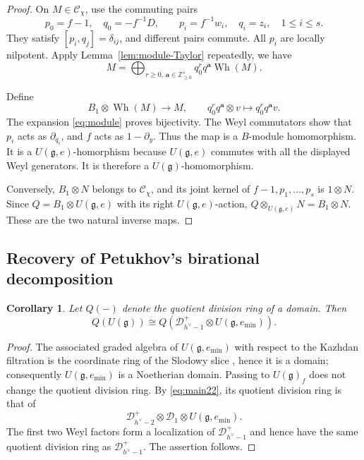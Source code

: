 \documentclass[12pt,a4paper]{amsart}
\numberwithin{equation}{section}
\newtheorem{corollary}[theorem]{Corollary}
\theoremstyle{definition}
\theoremstyle{remark}
\newcommand{\g}{\mathfrak g}
\newcommand{\D}{\mathcal D}
\newcommand{\N}{\mathbb Z_{\geq0}}
\newcommand{\Wh}{\operatorname{Wh}}
\newcommand{\Cchi}{\mathcal C_\chi}
\newcommand{\ba}{\mathbf{a}}
\begin{document}
\begin{proof}
On \(M\in\Cchi\), use the commuting pairs
\[
 p_0=f-1,\quad q_0=-f^{-1}D,\qquad
 p_i=f^{-1}w_i,\quad q_i=z_i, \quad 1\leq i\leq s.
\]
They satisfy \([p_i,q_j]=\delta_{ij}\), and different pairs commute.
All \(p_i\) are locally nilpotent.
Apply Lemma~\ref{lem:module-Taylor} repeatedly, we have
\begin{equation}\label{eq:module}
 M=\bigoplus_{r\geq0,\,\ba\in\N^s}
       q_0^r q^{\ba}\Wh(M).
\end{equation}

Define
\[
 B_1\otimes\Wh(M)\rightarrow M,
 \qquad q_0^r q^{\ba}\otimes v
 \mapsto q_0^r q^{\ba}v.
\]
The expansion \eqref{eq:module} proves bijectivity. The Weyl commutators show that
\(p_i\) acts as \(\partial_{q_i}\), and
\(f\) acts as \(1-\partial_y\).
Thus the map is a \(B\)-module homomorphism. It is a \(U(\g,e)\)-homorphism because \(U(\g,e)\)
commutes with all the displayed Weyl generators.
It is therefore a \(U(\g)\)-homomorphism.

Conversely, \(B_1\otimes N\) belongs to \(\Cchi\), and its joint
kernel of \(f-1,p_1,\ldots,p_s\) is \(1\otimes N\).
Since \(Q=B_1\otimes U(\g,e)\) with its right \(U(\g,e)\)-action,
\(Q\otimes_{U(\g,e)}N=B_1\otimes N\). These are the two natural inverse maps.
\end{proof}


\subsection{Recovery of Petukhov's birational decomposition}


\begin{corollary}\cite{Petukhov}\label{cor:quotient-field}
Let $Q(-)$ denote the quotient division ring of a domain.  Then
\[
Q(U(\g))\cong
Q\!\left(\D^+_{h^\vee-1}\otimes U(\g,e_{\min})\right).
\]
\end{corollary}

\begin{proof}
The  associated graded algebra of $U(\g,e_{\min})$ with respect to the Kazhdan filtration is the
coordinate ring of the Slodowy slice \cite{Pr1}, hence it is a domain; consequently
$U(\g,e_{\min})$ is a Noetherian domain.  Passing to
$U(\g)_f$ does not change the quotient division ring.  By
\eqref{eq:main22}, its quotient division ring is that of
\[
\D^+_{h^\vee-2}\otimes\D_{1}\otimes U(\g,e_{\min}).
\]
The first two Weyl factors form a localization of
$\D^+_{h^\vee-1}$ and hence have the same quotient division ring as
$\D^+_{h^\vee-1}$.  The assertion follows.
\end{proof}
\end{document}
